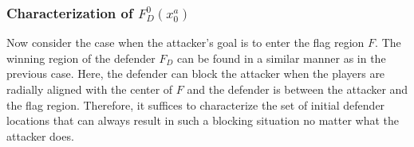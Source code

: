 \documentclass[letterpaper, 10 pt, conference]{ieeeconf}  %
\numberwithin{algorithm}{section}
\begin{document}

\subsubsection{Characterization of $F_D^0(x^a_0)$}
\label{sec:FD0}
Now consider the case when the attacker's goal is to enter the flag region $F$.  The winning region of the defender $F_D$ can be found in a similar manner as in the previous case.  Here, the defender can block the attacker when the players are radially aligned with the center of $F$ and the defender is between the attacker and the flag region.  Therefore, it suffices to characterize the set of initial defender locations that can always result in such a blocking situation no matter what the attacker does. 


\end{document}
